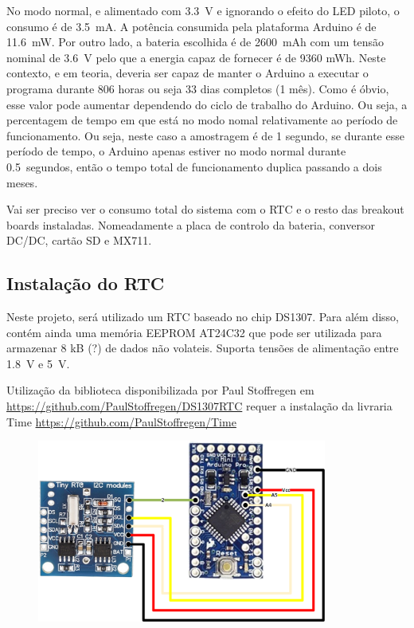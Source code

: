 \documentclass{article}
\begin{document}
No modo normal, e alimentado com 3.3~V e ignorando o efeito do LED piloto, o consumo é de 3.5~mA. A potência consumida pela plataforma Arduino é de 11.6~mW. Por outro lado, a bateria escolhida é de 2600~mAh com um tensão nominal de 3.6~V pelo que a energia capaz de fornecer é de 9360 mWh. Neste contexto, e em teoria, deveria ser capaz de manter o Arduino a executar o programa durante 806 horas ou seja 33 dias completos (1 mês). Como é óbvio, esse valor pode aumentar dependendo do ciclo de trabalho do Arduino. Ou seja, a percentagem de tempo em que está no modo nomal relativamente ao período de funcionamento. Ou seja, neste caso a amostragem é de 1 segundo, se durante esse período de tempo, o Arduino apenas estiver no modo normal durante 0.5~segundos, então o tempo total de funcionamento duplica passando a dois meses.

Vai ser preciso ver o consumo total do sistema com o RTC e o resto das breakout boards instaladas. Nomeadamente a placa de controlo da bateria, conversor DC/DC, cartão SD e MX711. 

\subsection{Instalação do RTC}

Neste projeto, será utilizado um RTC baseado no chip DS1307. Para além disso, contém ainda uma memória EEPROM AT24C32 que pode ser utilizada para armazenar 8 kB (?) de dados não volateis. Suporta tensões de alimentação entre 1.8~V e 5~V.

Utilização da biblioteca disponibilizada por Paul Stoffregen em \url{https://github.com/PaulStoffregen/DS1307RTC} requer a instalação da livraria Time \url{https://github.com/PaulStoffregen/Time}

\begin{figure}[htb!]
\centering
\includegraphics[width=0.85\textwidth]{Figuras/Fig21.png}
\label{fig:fig15}
\end{figure}
\end{document}
